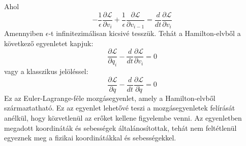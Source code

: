 \documentclass[../main.tex]{subfiles}
\begin{document}
Ahol
\begin{equation}
    - \frac{1}{\epsilon} \frac{\partial \mathcal{L}}{\partial v_i} + \frac{1}{\epsilon} \frac{\partial \mathcal{L}}{\partial v_{i-1}} = \frac{d}{dt} \frac{\partial \mathcal{L}}{\partial v_i}
\end{equation}
Amennyiben $\epsilon$-t infinitezimálisan kicsivé tesszük. Tehát a Hamilton-elvből a következő egyenletet kapjuk:
\begin{equation}
    \frac{\partial \mathcal{L}}{\partial q_i} - \frac{d}{dt} \frac{\partial \mathcal{L}}{\partial v_i} = 0
\end{equation}
vagy a klasszikus jelöléssel:
\begin{equation}
    \frac{\partial \mathcal{L}}{\partial q} - \frac{d}{dt} \frac{\partial \mathcal{L}}{\partial \dot{q}} = 0
\end{equation}
Ez az Euler-Lagrange-féle mozgásegyenlet, amely a Hamilton-elvből származtatható. Ez az egyenlet lehetővé teszi a mozgásegyenletek felírását anélkül, hogy közvetlenül az erőket kellene figyelembe venni. Az egyenletben megadott koordináták és sebességek általánosítottak,
tehát nem feltétlenül egyeznek meg a fizikai koordinátákkal és sebességekkel.
\end{document}
